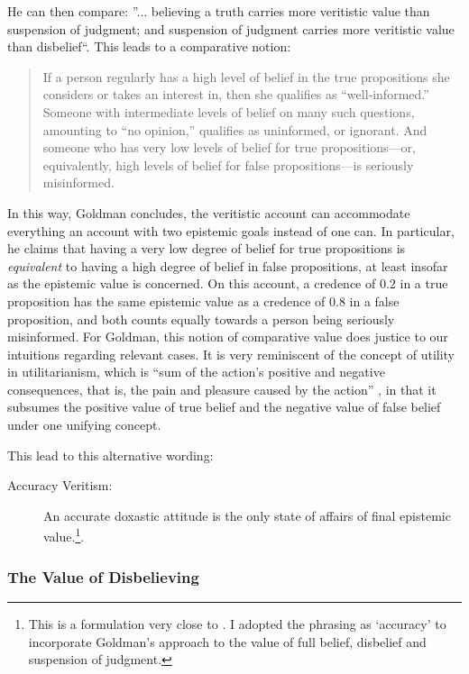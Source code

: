 \documentclass[12pt,numbers=noenddot]{scrartcl}
\begin{document}
He can then compare: ”... believing a truth carries more veritistic value than suspension of judgment; and suspension of judgment carries more veritistic value than disbelief“. This leads to a comparative notion:

\begin{quote}
    If a person regularly has a high level of belief in the true propositions she considers or takes an interest in, then she qualifies as “well‐informed.” Someone with intermediate levels of belief on many such questions, amounting to “no opinion,” qualifies as uninformed, or ignorant. And someone who has very low levels of belief for true propositions—or, equivalently, high levels of belief for false propositions—is seriously misinformed. \textcite[58]{Goldman2002-GOLTUO-2}
\end{quote}

In this way, Goldman concludes, the veritistic account can accommodate everything an account with two epistemic goals instead of one can. In particular, he claims that having a very low degree of belief for true propositions is \emph{equivalent} to having a high degree of belief in false propositions, at least insofar as the epistemic value is concerned. On this account, a credence of $0.2$ in a true proposition has the same epistemic value as a credence of $0.8$ in a false proposition, and both counts equally towards a person being seriously misinformed. For Goldman, this notion of comparative value does justice to our intuitions regarding relevant cases. It is very reminiscent of the concept of utility in utilitarianism, which is “sum of the action's positive and negative consequences, that is, the pain and pleasure caused by the action” \autocite{depaul_value_2001}, in that it subsumes the positive value of true belief and the negative value of false belief under one unifying concept.

This lead to this alternative wording:
\begin{description}
    \item[Accuracy Veritism:] An accurate doxastic attitude is the only state of affairs of final epistemic value.\footnote{This is a formulation very close to \textcite[9]{Pettigrew2016-PETAAT-7}. I adopted the phrasing as ‘accuracy’ to incorporate Goldman's approach to the value of full belief, disbelief and suspension of judgment.}.
\end{description}

\subsubsection{The Value of Disbelieving}
\end{document}
